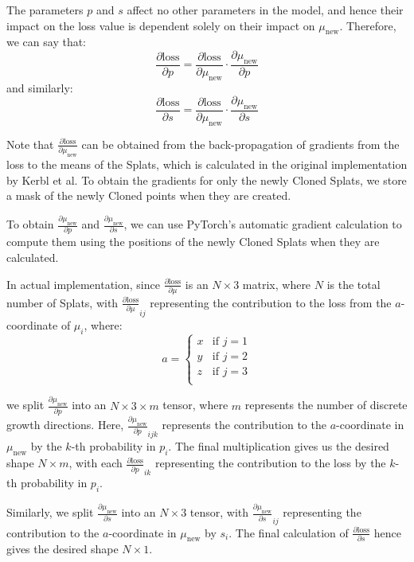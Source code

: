 \documentclass[11pt]{report}
\begin{document}
The parameters $p$ and $s$ affect no other parameters in the model, and hence their impact on the loss value is dependent solely on their impact on $\mu_{\text{new}}$. Therefore, we can say that:
\[ \frac{\partial \text{loss}}{\partial p} = \frac{\partial \text{loss}}{\partial \mu_{\text{new}}} \cdot \frac{\partial \mu_{\text{new}}}{\partial p} \]
and similarly:
\[ \frac{\partial \text{loss}}{\partial s} = \frac{\partial \text{loss}}{\partial \mu_{\text{new}}} \cdot \frac{\partial \mu_{\text{new}}}{\partial s} \]

Note that $\frac{\partial \text{loss}}{\partial \mu_{\text{new}}}$ can be obtained from the back-propagation of gradients from the loss to the means of the Splats, which is calculated in the original implementation by Kerbl et al. To obtain the gradients for only the newly Cloned Splats, we store a mask of the newly Cloned points when they are created.

To obtain $\frac{\partial \mu_{\text{new}}}{\partial p}$ and $\frac{\partial \mu_{\text{new}}}{\partial s}$, we can use PyTorch's automatic gradient calculation to compute them using the positions of the newly Cloned Splats when they are calculated.

In actual implementation, since $\frac{\partial \text{loss}}{\partial \mu}$ is an $N \times 3$ matrix, where $N$ is the total number of Splats, with $\frac{\partial \text{loss}}{\partial \mu}_{ij}$ representing the contribution to the loss from the $a$-coordinate of $\mu_{i}$, where:
\[ a = \begin{cases}
x & \textrm{if }j=1\\
y & \textrm{if }j=2\\
z & \textrm{if }j=3\\
\end{cases} \]

we split $\frac{\partial \mu_{\text{new}}}{\partial p}$ into an $N \times 3 \times m$ tensor, where $m$ represents the number of discrete growth directions. Here, $\frac{\partial \mu_{\text{new}}}{\partial p}_{ijk}$ represents the contribution to the $a$-coordinate in $\mu_{\text{new}}$ by the $k$-th probability in $p_i$. The final multiplication gives us the desired shape $N \times m$, with each $\frac{\partial \text{loss}}{\partial p}_{ik}$ representing the contribution to the loss by the $k$-th probability in $p_i$.

Similarly, we split $\frac{\partial \mu_{\text{new}}}{\partial s}$ into an $N \times 3$ tensor, with $\frac{\partial \mu_{\text{new}}}{\partial s}_{ij}$ representing the contribution to the $a$-coordinate in $\mu_{\text{new}}$ by $s_{i}$. The final calculation of $\frac{\partial \text{loss}}{\partial s}$ hence gives the desired shape $N \times 1$.
\end{document}
